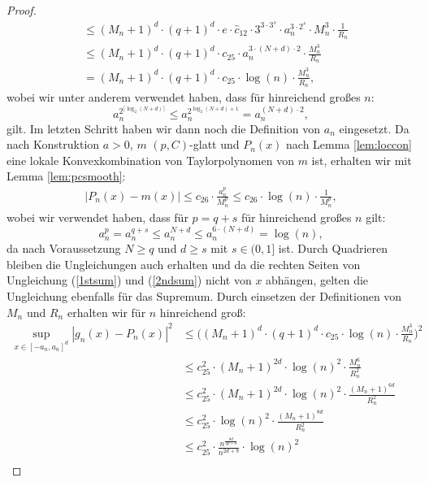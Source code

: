 \begin{proof}
\begin{equation}
\begin{split}
& \leq (M_n + 1)^d \cdot (q + 1)^d \cdot e \cdot \hat{c}_{12} \cdot 3^{3 \cdot 3^s} \cdot a_n^{3 \cdot 2^s} \cdot M_n^3 \cdot \frac{1}{R_n} \\
& \leq (M_n + 1)^d \cdot (q + 1)^d \cdot c_{25}\cdot a_n^{3 \cdot (N + d) \cdot 2} \cdot \frac{M_n^3}{R_n} \\
& =  (M_n + 1)^d \cdot (q + 1)^d \cdot c_{25}\cdot \log(n) \cdot \frac{M_n^3}{R_n},
\end{split}
\end{equation}
wobei wir unter anderem verwendet haben, dass für hinreichend großes $n$:
$$a_n^{2^{\lceil\log_2(N + d)\rceil}} \leq a_n^{2^{\log_2(N + d) + 1}} = a_n^{(N + d) \cdot 2},$$ gilt. Im letzten Schritt haben wir dann noch die Definition von $a_n$ eingesetzt. 
Da nach Konstruktion $a > 0$, $m$ $(p, C)$-glatt und $P_n(x)$ nach Lemma \ref{lem:loccon} eine lokale Konvexkombination von Taylorpolynomen von $m$ ist, erhalten wir mit Lemma \ref{lem:pcsmooth}:
\begin{equation}
\label{2ndsum}
\begin{split}
|P_n(x) - m(x)| \leq c_{26} \cdot \frac{a_n^p}{M_n^p} \leq c_{26} \cdot \log(n) \cdot \frac{1}{M_n^p} , 
\end{split}
\end{equation}
wobei wir verwendet haben, dass für $p = q + s$ für hinreichend großes $n$ gilt:
$$a_n^p = a_n^{q + s} \leq a_n^{N + d} \leq a_n^{6 \cdot (N + d)} = \log(n),$$
da nach Voraussetzung $N \geq q$ und $d \geq s$ mit $s \in (0, 1]$ ist.
Durch Quadrieren bleiben die Ungleichungen auch erhalten und da die rechten Seiten von Ungleichung (\ref{1stsum}) und (\ref{2ndsum}) nicht von $x$ abhängen, gelten die Ungleichung ebenfalls für das Supremum.   Durch einsetzen der Definitionen von $M_n$ und $R_n$ erhalten wir für $n$ hinreichend groß:
\begin{equation}
\label{3rdsum}
\begin{split}
\sup_{x \in [-a_n, a_n]^d} |g_n(x) - P_n(x)|^2 & \leq \bigg((M_n + 1)^d \cdot (q + 1)^d \cdot c_{25}\cdot \log(n) \cdot \frac{M_n^3}{R_n}\bigg)^2 \\
& \leq c_{25}^2 \cdot (M_n + 1)^{2d} \cdot \log(n)^2 \cdot \frac{M_n^6}{R_n^2} \\
& \leq  c_{25}^2 \cdot (M_n + 1)^{2d} \cdot \log(n)^2 \cdot \frac{(M_n + 1)^{6d}}{R_n^2} \\
& \leq  c_{25}^2 \cdot \log(n)^2 \cdot \frac{(M_n + 1)^{8d}}{R_n^2} \\
& \leq c_{25}^2 \cdot \frac{n^{\frac{8d}{2p + d}}}{n^{2d + 8}} \cdot \log(n)^2 \\

\end{split}
\end{equation}
\end{proof}
